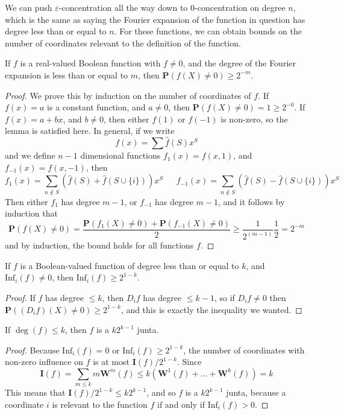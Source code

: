 We can push $\varepsilon$-concentration all the way down to $0$-concentration on degree $n$, which is the same as saying the Fourier expansion of the function in question has degree less than or equal to $n$. For these functions, we can obtain bounds on the number of coordinates relevant to the definition of the function.

\begin{lemma}
    If $f$ is a real-valued Boolean function with $f \neq 0$, and the degree of the Fourier expansion is less than or equal to $m$, then $\mathbf{P}(f(X) \neq 0) \geq 2^{-m}$.
\end{lemma}
\begin{proof}
    We prove this by induction on the number of coordinates of $f$. If $f(x) = a$ is a constant function, and $a \neq 0$, then $\mathbf{P}(f(X) \neq 0) = 1 \geq 2^{-0}$. If $f(x) = a + bx$, and $b \neq 0$, then either $f(1)$ or $f(-1)$ is non-zero, so the lemma is satisfied here. In general, if we write
    \[ f(x) = \sum \widehat{f}(S) x^S \]
    and we define $n-1$ dimensional functions $f_1(x) = f(x,1)$, and $f_{-1}(x) = f(x,-1)$, then
    \[ f_1(x) = \sum_{n \not \in S} \left( \widehat{f}(S) + \widehat{f}(S \cup \{ i \}) \right) x^S\ \ \ \ \ \ \ f_{-1}(x) = \sum_{n \not \in S} \left( \widehat{f}(S) - \widehat{f}(S \cup \{ i \}) \right) x^S \]
    Then either $f_1$ has degree $m-1$, or $f_{-1}$ has degree $m-1$, and it follows by induction that
    \[ \mathbf{P}(f(X) \neq 0) = \frac{\mathbf{P}(f_1(X) \neq 0) + \mathbf{P}(f_{-1}(X) \neq 0)}{2} \geq \frac{1}{2^{(m-1)}} \frac{1}{2} = 2^{-m} \]
    and by induction, the bound holds for all functions $f$.
\end{proof}

\begin{corollary}
    If $f$ is a Boolean-valued function of degree less than or equal to $k$, and $\text{Inf}_i(f) \neq 0$, then $\text{Inf}_i(f) \geq 2^{1-k}$.
\end{corollary}
\begin{proof}
    If $f$ has degree $\leq k$, then $D_i f$ has degree $\leq k-1$, so if $D_i f \neq 0$ then $\mathbf{P}((D_i f)(X) \neq 0) \geq 2^{1-k}$, and this is exactly the inequality we wanted.
\end{proof}

\begin{theorem}
    If $\deg(f) \leq k$, then $f$ is a $k2^{k-1}$ junta.
\end{theorem}
\begin{proof}
    Because $\text{Inf}_i(f) = 0$ or $\text{Inf}_i(f) \geq 2^{1-k}$, the number of coordinates with non-zero influence on $f$ is at most $\mathbf{I}(f)/2^{1-k}$. Since
    \[ \mathbf{I}(f) = \sum_{m \leq k} m \mathbf{W}^m(f) \leq k (\mathbf{W}^1(f) + \dots + \mathbf{W}^k(f)) = k \]
    This means that $\mathbf{I}(f)/2^{1-k} \leq k2^{k-1}$, and so $f$ is a $k2^{k-1}$ junta, because a coordinate $i$ is relevant to the function $f$ if and only if $\text{Inf}_i(f) > 0$.
\end{proof}

